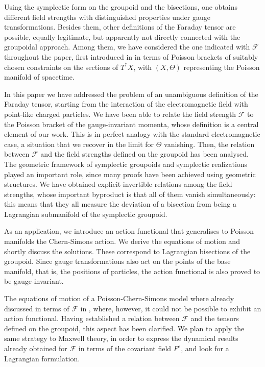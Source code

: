 \documentclass[12pt,a4paper]{article}
\numberwithin{equation}{section}
\theoremstyle{definition}
\begin{document}
{Using the symplectic form on the groupoid and the bisections, one obtains different field strengths with distinguished properties under gauge transformations. Besides them, other definitions of the Faraday tensor are possible, equally legitimate, but apparently not directly connected with the groupoidal approach. Among them, we have considered the one indicated with $\mathcal{F}$ throughout the paper,  first introduced in \cite{Kupriyanov:2022ohu} in terms of  Poisson brackets of suitably chosen  constraints on the sections of $T^*X$, with $(X, \Theta)$ representing the Poisson manifold of spacetime. 

In this paper we have addressed the problem of an unambiguous  definition of the Faraday tensor, starting from %
the interaction of the electromagnetic field with point-like charged particles. We have been able to relate the field strength $\mathcal{F}$ to the Poisson bracket of the gauge-invariant momenta, whose definition is  a  central element of our work.   This is in perfect analogy with the standard electromagnetic case, a situation that we recover in the limit for $\Theta$ vanishing. 
Then, the relation between $\mathcal{F}$ and the field strengths defined on the groupoid has been analysed.  The geometric framework of symplectic groupoids and symplectic realizations played an important role, since many proofs have been achieved using geometric structures. We have obtained explicit invertible relations among the field strengths, whose important byproduct  is that all of them vanish simultaneously: this means that they all measure the deviation of a bisection from being a Lagrangian submanifold of the symplectic groupoid. 

As an application,   we introduce an action functional  that generalises to Poisson manifolds the Chern-Simons action. We derive the equations of motion and shortly discuss the solutions. These  correspond to Lagrangian bisections of the groupoid. 
Since gauge transformations also act  on the points of the base manifold,  that is, the  positions of particles,  the action functional is also proved to be gauge-invariant.

The equations of motion of a Poisson-Chern-Simons model where already discussed in terms of $\mathcal{F}$ in \cite{Kupriyanov:2019cug}, where, however, it could not be possible to exhibit an action functional. Having established a relation between $\mathcal{F}$ and the tensors defined on the groupoid, this aspect has been clarified. We plan to apply the same strategy  to  Maxwell theory, in order  to express the dynamical results already obtained for  $\mathcal{F}$ in terms of the covariant field $F^s$, and look for a Lagrangian formulation.     


}
\end{document}

